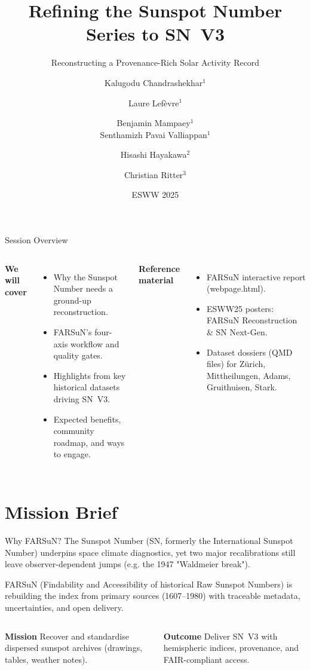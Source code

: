 \documentclass[aspectratio=169]{beamer}
\title{\textcolor{royal}{Refining the Sunspot Number Series to SN~V3}}
\subtitle{\textcolor{royal}{Reconstructing a Provenance-Rich Solar Activity Record}}
\author[FarSuN Team]{Kalugodu Chandrashekhar$^{1}$ \and Laure Lef\`evre$^{1}$ \and Benjamin Mampaey$^{1}$ \\
Senthamizh Pavai Valliappan$^{1}$ \and Hisashi Hayakawa$^{2}$ \and Christian Ritter$^{3}$}
\institute[ROB / SILSO]{\scriptsize $^{1}$ Royal Observatory of Belgium (ROB) / SILSO\quad $^{2}$ Nagoya University\quad $^{3}$ Universit\'e Catholique de Louvain, ISBA, LIDAM}
\date{ESWW 2025}
\newcommand{\callout}[2]{\textbf{\textcolor{accent}{#1}}\,\,\textcolor{royal}{#2}}
\begin{document}
\begin{frame}
  \titlepage
\end{frame}

\begin{frame}[t]{Session Overview}
\begin{columns}[T,onlytextwidth]
\textbf{We will cover}
\begin{itemize}
  \item Why the Sunspot Number needs a ground-up reconstruction.
  \item FARSuN's four-axis workflow and quality gates.
  \item Highlights from key historical datasets driving SN~V3.
  \item Expected benefits, community roadmap, and ways to engage.
\end{itemize}

\textbf{Reference material}
\begin{itemize}
  \item FARSuN interactive report (webpage.html).
  \item ESWW25 posters: FARSuN Reconstruction \& SN Next-Gen.
  \item Dataset dossiers (QMD files) for Zürich, Mittheilungen, Adams, Gruithuisen, Stark.
\end{itemize}
\end{columns}
\end{frame}

\section[Mission]{Mission Brief}

\begin{frame}[t]{Why FARSuN?}
\small
The Sunspot Number (SN, formerly the International Sunspot Number) underpins space climate diagnostics, yet two major recalibrations still leave observer-dependent jumps (e.g. the 1947 "Waldmeier break").\linebreak[1]

\medskip
FARSuN (Findability and Accessibility of historical Raw Sunspot Numbers) is rebuilding the index from primary sources (1607--1980) with traceable metadata, uncertainties, and open delivery.

\vspace{0.6em}
\begin{columns}[T,onlytextwidth]
\callout{Mission}{Recover and standardise dispersed sunspot archives (drawings, tables, weather notes).}

\callout{Outcome}{Deliver SN~V3 with hemispheric indices, provenance, and FAIR-compliant access.}
\end{columns}
\end{frame}
\end{document}
